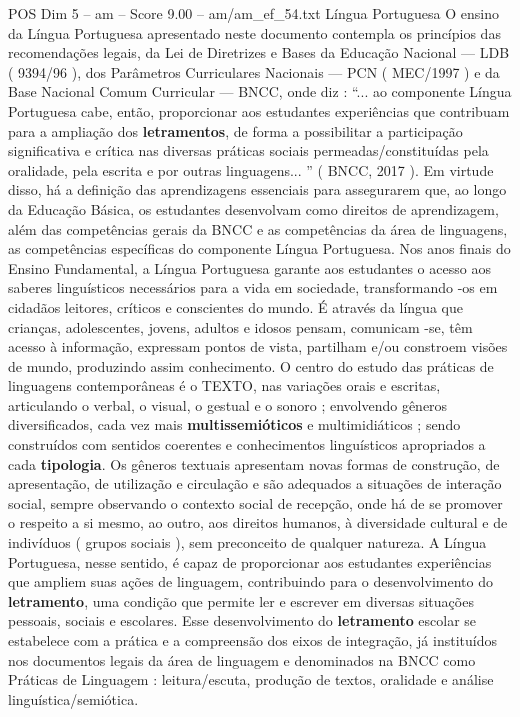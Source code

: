\begin{textsample}{POS Dim 5 – am – Score 9.00 – am/am\_ef\_54.txt}  \label{ex:f5_pos_065}
Língua Portuguesa O ensino da Língua Portuguesa apresentado neste documento contempla os princípios das recomendações legais, da Lei de Diretrizes e Bases da Educação Nacional — LDB ( 9394/96 ), dos Parâmetros Curriculares Nacionais — PCN ( MEC/1997 ) e da Base Nacional Comum Curricular — BNCC, onde diz : “... ao componente Língua Portuguesa cabe, então, proporcionar aos estudantes experiências que contribuam para a ampliação dos \textbf{letramentos}, de forma a possibilitar a participação significativa e crítica nas diversas práticas sociais permeadas/constituídas pela oralidade, pela escrita e por outras linguagens... ” ( BNCC, 2017 ).
Em virtude disso, há a definição das aprendizagens essenciais para assegurarem que, ao longo da Educação Básica, os estudantes desenvolvam como direitos de aprendizagem, além das competências gerais da BNCC e as competências da área de linguagens, as competências específicas do componente Língua Portuguesa.
Nos anos finais do Ensino Fundamental, a Língua Portuguesa garante aos estudantes o acesso aos saberes linguísticos necessários para a vida em sociedade, transformando -os em cidadãos leitores, críticos e conscientes do mundo.
É através da língua que crianças, adolescentes, jovens, adultos e idosos pensam, comunicam -se, têm acesso à informação, expressam pontos de vista, partilham e/ou constroem visões de mundo, produzindo assim conhecimento.
O centro do estudo das práticas de linguagens contemporâneas é o TEXTO, nas variações orais e escritas, articulando o verbal, o visual, o gestual e o sonoro ; envolvendo gêneros diversificados, cada vez mais \textbf{multissemióticos} e multimidiáticos ; sendo construídos com sentidos coerentes e conhecimentos linguísticos apropriados a cada \textbf{tipologia}.
Os gêneros textuais apresentam novas formas de construção, de apresentação, de utilização e circulação e são adequados a situações de interação social, sempre observando o contexto social de recepção, onde há de se promover o respeito a si mesmo, ao outro, aos direitos humanos, à diversidade cultural e de indivíduos ( grupos sociais ), sem preconceito de qualquer natureza.
A Língua Portuguesa, nesse sentido, é capaz de proporcionar aos estudantes experiências que ampliem suas ações de linguagem, contribuindo para o desenvolvimento do \textbf{letramento}, uma condição que permite ler e escrever em diversas situações pessoais, sociais e escolares.
Esse desenvolvimento do \textbf{letramento} escolar se estabelece com a prática e a compreensão dos eixos de integração, já instituídos nos documentos legais da área de linguagem e denominados na BNCC como Práticas de Linguagem : leitura/escuta, produção de textos, oralidade e análise linguística/semiótica.

\end{textsample}
